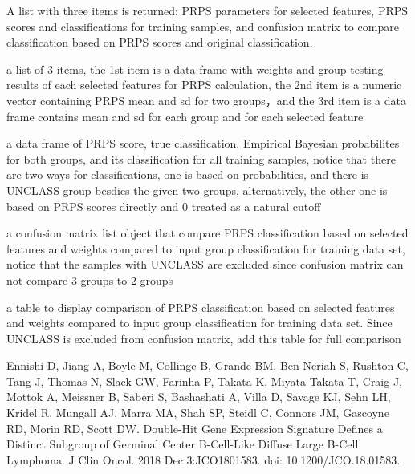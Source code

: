 \documentclass[letterpaper]{book}
\begin{document}
\begin{Value}
A list with three items is returned: PRPS parameters for selected features, PRPS scores and classifications for training samples, and confusion matrix to compare classification based on PRPS scores and original classification.
\begin{ldescription}
\item[\code{PRPS\_pars}] a list of 3 items, the 1st item is a data frame with weights and group testing results of each selected features for PRPS calculation, the 2nd item is a numeric vector containing PRPS mean and sd for two groups，and the 3rd item is a data frame contains mean and sd for each group and for each selected feature
\item[\code{PRPS\_train}] a data frame of PRPS score, true classification, Empirical Bayesian probabilites for both groups, and its classification for all training samples, notice that there are two ways for classifications, one is based on probabilities, and there is UNCLASS group besdies the given two groups, alternatively, the other one is based on PRPS scores directly and 0 treated as a natural cutoff
\item[\code{classCompare}] a confusion matrix list object that compare PRPS classification based on selected features and weights compared to input group classification for training data set, notice that the samples with UNCLASS are excluded since confusion matrix can not compare 3 groups to 2 groups
\item[\code{classTable}] a table to display comparison of PRPS classification based on selected features and weights compared to input group classification for training data set. Since UNCLASS is excluded from confusion matrix, add this table for full comparison
\end{ldescription}
\end{Value}
%
\begin{References}\relax
Ennishi D, Jiang A, Boyle M, Collinge B, Grande BM, Ben-Neriah S, Rushton C, Tang J, Thomas N, Slack GW, Farinha P, 
Takata K, Miyata-Takata T, Craig J, Mottok A, Meissner B, Saberi S, Bashashati A, Villa D, Savage KJ, Sehn LH, Kridel R, 
Mungall AJ, Marra MA, Shah SP, Steidl C, Connors JM, Gascoyne RD, Morin RD, Scott DW. Double-Hit Gene Expression Signature Defines
a Distinct Subgroup of Germinal Center B-Cell-Like Diffuse Large B-Cell Lymphoma. J Clin Oncol. 
2018 Dec 3:JCO1801583. doi: 10.1200/JCO.18.01583.
\end{References}
\end{document}
